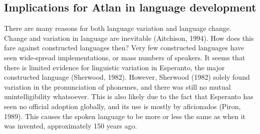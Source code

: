 \subsection{Implications for Atlan in language development}

There are many reasons for both language variation and language change. Change and variation in language are inevitable (Aitchison, 1994). How does this fare against constructed languages then? Very few constructed languages have seen wide-spread implementations, or mass numbers of speakers. It seems that there is limited evidence for linguistic variation in Esperanto, the major constructed language (Sherwood, 1982). However, Sherwood (1982) solely found  variation in the pronunciation of phonemes, and there was still no mutual unintelligibility whatsoever. This is also likely due to the fact that Esperanto has seen no official adoption globally, and its use is mostly by aficionados (Piron, 1989). This causes the spoken language to be more or less the same as when it was invented, approximately 150 years ago. 


